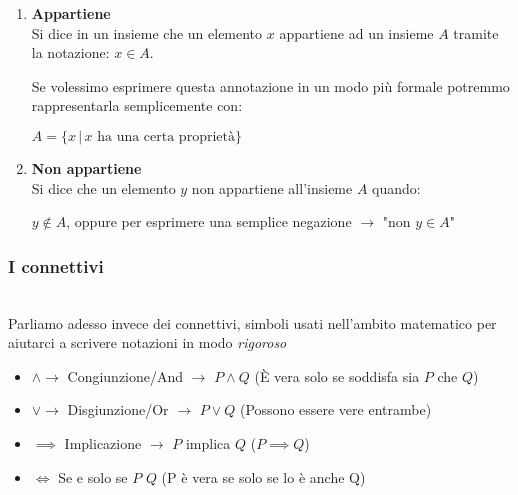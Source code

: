 \documentclass[article,12pt]{book}
\begin{document}
\begin{enumerate}
    \item \textbf{Appartiene} \\[1ex]
    Si dice in un insieme che un elemento \( x \) appartiene ad un insieme \( A \) tramite la notazione:  \( x \in A \).
    
    Se volessimo esprimere questa annotazione in un modo più formale potremmo rappresentarla semplicemente con:
    
    \begin{center}
        \( A = \{ x \,|\, x \text{ ha una certa proprietà} \} \)
    \end{center}

    \item \textbf{Non appartiene} \\[1ex]
    Si dice che un elemento \( y \) non appartiene all'insieme \( A \) quando: 
    \begin{center}
        \( y \notin A \), oppure per esprimere una semplice negazione \( \rightarrow \) "non \( y \in A \)"
    \end{center}
\end{enumerate}

\subsubsection{I connettivi} \\[1ex]
Parliamo adesso invece dei connettivi, simboli usati nell'ambito matematico per aiutarci a scrivere notazioni in modo \textit{rigoroso}

\begin{itemize}
    \item \( \land \rightarrow \) Congiunzione/And \( \rightarrow \) \( P \land Q \) 
    (È vera solo se soddisfa sia \( P \) che \( Q \))
    
    \item \( \lor \rightarrow \) Disgiunzione/Or \( \rightarrow \) \( P \lor Q \)  
    (Possono essere vere entrambe)
    
    \item \( \implies \) Implicazione \( \rightarrow \) \( P \) implica \( Q \)
    (\( P \implies Q \))

    \item $\iff$ Se e solo se \rightarrow \(P\) \iff \(Q\) (P è vera se solo se lo è anche Q)

\end{itemize}
\\[1ex]
\end{document}
